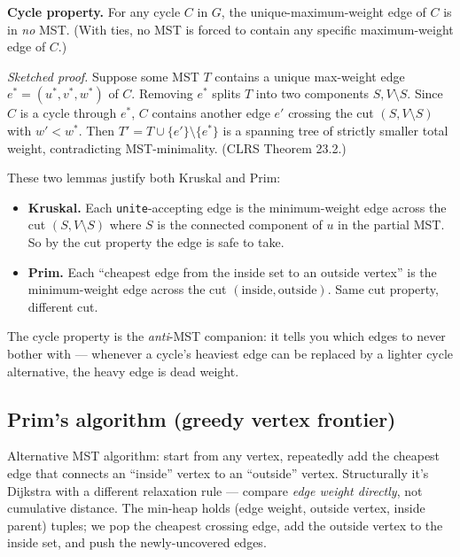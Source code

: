 \documentclass[11pt]{article}
\begin{document}
\begin{defnbox}
\textbf{Cycle property.} For any cycle $C$ in $G$, the
unique-maximum-weight edge of $C$ is in \emph{no} MST. (With ties,
no MST is forced to contain any specific maximum-weight edge of
$C$.)

\emph{Sketched proof.} Suppose some MST $T$ contains a unique
max-weight edge $e^* = (u^*, v^*, w^*)$ of $C$. Removing $e^*$
splits $T$ into two components $S, V \setminus S$. Since $C$ is a
cycle through $e^*$, $C$ contains another edge $e'$ crossing the
cut $(S, V \setminus S)$ with $w' < w^*$. Then
$T' = T \cup \{e'\} \setminus \{e^*\}$ is a spanning tree of
strictly smaller total weight, contradicting MST-minimality. (CLRS
Theorem 23.2.)
\end{defnbox}

These two lemmas justify both Kruskal and Prim:
\begin{itemize}[leftmargin=*]
    \item \textbf{Kruskal.} Each \texttt{unite}-accepting edge is
          the minimum-weight edge across the cut
          $(S, V \setminus S)$ where $S$ is the connected component
          of $u$ in the partial MST. So by the cut property the edge
          is safe to take.
    \item \textbf{Prim.} Each ``cheapest edge from the inside set
          to an outside vertex'' is the minimum-weight edge across
          the cut $(\text{inside}, \text{outside})$. Same cut
          property, different cut.
\end{itemize}

The cycle property is the \emph{anti}-MST companion: it tells you
which edges to never bother with --- whenever a cycle's heaviest
edge can be replaced by a lighter cycle alternative, the heavy edge
is dead weight.

\subsection*{Prim's algorithm (greedy vertex frontier)}

Alternative MST algorithm: start from any vertex, repeatedly add
the cheapest edge that connects an ``inside'' vertex to an
``outside'' vertex. Structurally it's Dijkstra with a different
relaxation rule --- compare \emph{edge weight directly}, not
cumulative distance. The min-heap holds (edge weight, outside
vertex, inside parent) tuples; we pop the cheapest crossing edge,
add the outside vertex to the inside set, and push the
newly-uncovered edges.
\end{document}
